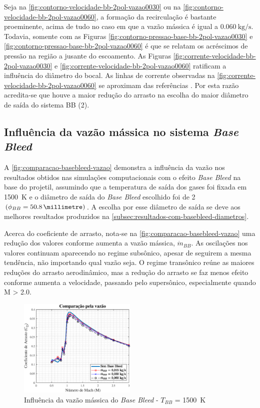 Seja na \autoref{fig:contorno-velocidade-bb-2pol-vazao0030} ou na \autoref{fig:contorno-velocidade-bb-2pol-vazao0060}, a formação da recirculação é bastante proeminente, acima de tudo no caso em que a vazão mássica é igual a \(\qty{0,060}{\kilogram\per\second}\). Todavia, somente com as Figuras \ref{fig:contorno-pressao-base-bb-2pol-vazao0030} e \ref{fig:contorno-pressao-base-bb-2pol-vazao0060} é que se relatam os acréscimos de pressão na região a jusante do escoamento. As Figuras \ref{fig:corrente-velocidade-bb-2pol-vazao0030} e \ref{fig:corrente-velocidade-bb-2pol-vazao0060} ratificam a influência do diâmetro do bocal. As linhas de corrente observadas na \autoref{fig:corrente-velocidade-bb-2pol-vazao0060} se aproximam das referências \cite{Sahu1985,Mahmoud2009,Lucena2020}. Por esta razão acredita-se que houve a maior redução do arrasto na escolha do maior diâmetro de saída do sistema BB (\qty{2}{\polegada}).

\subsection{Influência da vazão mássica no sistema \textit{Base Bleed}} \label{subsec:resultados-com-basebleed-vazao}

A \autoref{fig:comparacao-basebleed-vazao} demonstra a influência da vazão nos resultados obtidos nas simulações computacionais com o efeito \textit{Base Bleed} na base do projetil, assumindo que a temperatura de saída dos gases foi fixada em \qty{1500}{\kelvin} e o diâmetro de saída do \textit{Base Bleed} escolhido foi de \qty{2}{\polegada} \(\left(\phi_{BB} = \qty{50,8}{\millimetre}\right)\). A escolha por esse diâmetro de saída se deve aos melhores resultados produzidos na \autoref{subsec:resultados-com-basebleed-diametros}.

Acerca do coeficiente de arrasto, nota-se na \autoref{fig:comparacao-basebleed-vazao} uma redução dos valores conforme aumenta a vazão mássica, \(\Dot{m}_{BB}\). As oscilações nos valores continuam aparecendo no regime subsônico, apesar de seguirem a mesma tendência, não importando qual vazão seja. O regime transônico reúne as maiores reduções do arrasto aerodinâmico, mas a redução do arrasto se faz menos efeito conforme aumenta a velocidade, passando pelo supersônico, especialmente quando M > \num{2,0}.

\begin{figure}[!ht]
	\centering
	\includegraphics[width=0.5\textwidth]{cd-combasebleed-1500K-2pol.eps}
	\caption{Influência da vazão mássica do \textit{Base Bleed} - \(T_{BB}\) = \qty{1500}{\kelvin}}
	\label{fig:comparacao-basebleed-vazao}
\end{figure}


